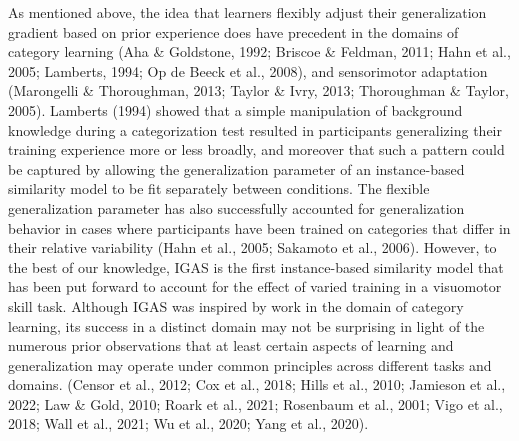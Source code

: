 \documentclass[
  jou, donotrepeattitle,floatsintext]{apa7}
\begin{document}
As mentioned above, the idea that learners flexibly adjust their generalization gradient based on prior experience does have precedent in the domains of category learning (Aha \& Goldstone, 1992; Briscoe \& Feldman, 2011; Hahn et al., 2005; Lamberts, 1994; Op de Beeck et al., 2008), and sensorimotor adaptation (Marongelli \& Thoroughman, 2013; Taylor \& Ivry, 2013; Thoroughman \& Taylor, 2005). Lamberts (1994) showed that a simple manipulation of background knowledge during a categorization test resulted in participants generalizing their training experience more or less broadly, and moreover that such a pattern could be captured by allowing the generalization parameter of an instance-based similarity model to be fit separately between conditions. The flexible generalization parameter has also successfully accounted for generalization behavior in cases where participants have been trained on categories that differ in their relative variability (Hahn et al., 2005; Sakamoto et al., 2006). However, to the best of our knowledge, IGAS is the first instance-based similarity model that has been put forward to account for the effect of varied training in a visuomotor skill task. Although IGAS was inspired by work in the domain of category learning, its success in a distinct domain may not be surprising in light of the numerous prior observations that at least certain aspects of learning and generalization may operate under common principles across different tasks and domains. (Censor et al., 2012; Cox et al., 2018; Hills et al., 2010; Jamieson et al., 2022; Law \& Gold, 2010; Roark et al., 2021; Rosenbaum et al., 2001; Vigo et al., 2018; Wall et al., 2021; Wu et al., 2020; Yang et al., 2020).
\end{document}
